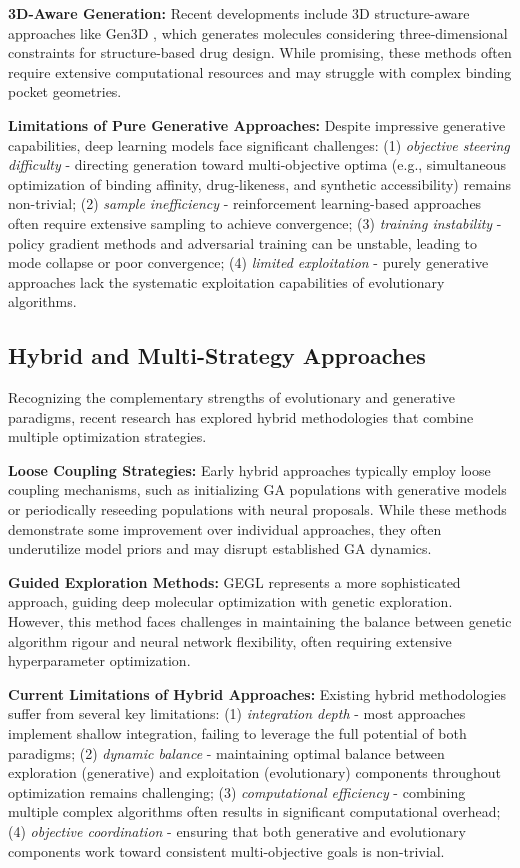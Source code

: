 \documentclass[lettersize,journal]{IEEEtran}
\begin{document}
\noindent \textbf{3D-Aware Generation:} Recent developments include 3D structure-aware approaches like Gen3D \cite{luoGraph2022}, which generates molecules considering three-dimensional constraints for structure-based drug design. While promising, these methods often require extensive computational resources and may struggle with complex binding pocket geometries.

\noindent \textbf{Limitations of Pure Generative Approaches:} Despite impressive generative capabilities, deep learning models face significant challenges: (1) \textit{objective steering difficulty} - directing generation toward multi-objective optima (e.g., simultaneous optimization of binding affinity, drug-likeness, and synthetic accessibility) remains non-trivial; (2) \textit{sample inefficiency} - reinforcement learning-based approaches often require extensive sampling to achieve convergence; (3) \textit{training instability} - policy gradient methods and adversarial training can be unstable, leading to mode collapse or poor convergence; (4) \textit{limited exploitation} - purely generative approaches lack the systematic exploitation capabilities of evolutionary algorithms.

\subsection{Hybrid and Multi-Strategy Approaches}

Recognizing the complementary strengths of evolutionary and generative paradigms, recent research has explored hybrid methodologies that combine multiple optimization strategies.

\noindent \textbf{Loose Coupling Strategies:} Early hybrid approaches typically employ loose coupling mechanisms, such as initializing GA populations with generative models or periodically reseeding populations with neural proposals. While these methods demonstrate some improvement over individual approaches, they often underutilize model priors and may disrupt established GA dynamics.

\noindent \textbf{Guided Exploration Methods:} GEGL \cite{ahnGuidingDeepMolecular2020} represents a more sophisticated approach, guiding deep molecular optimization with genetic exploration. However, this method faces challenges in maintaining the balance between genetic algorithm rigour and neural network flexibility, often requiring extensive hyperparameter optimization.

\noindent \textbf{Current Limitations of Hybrid Approaches:} Existing hybrid methodologies suffer from several key limitations: (1) \textit{integration depth} - most approaches implement shallow integration, failing to leverage the full potential of both paradigms; (2) \textit{dynamic balance} - maintaining optimal balance between exploration (generative) and exploitation (evolutionary) components throughout optimization remains challenging; (3) \textit{computational efficiency} - combining multiple complex algorithms often results in significant computational overhead; (4) \textit{objective coordination} - ensuring that both generative and evolutionary components work toward consistent multi-objective goals is non-trivial.
\end{document}
